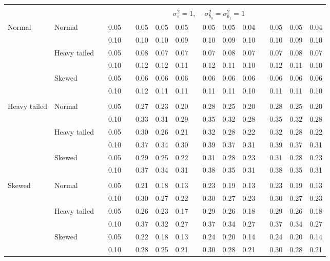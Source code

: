 \documentclass{article} %
\begin{document}
\begin{table}[ht]
\begin{scriptsize}
\begin{center}
\begin{tabular}{ll p{.1cm} c p{.1cm} rrr p{.1cm} rrr p{.1cm} rrr}
&&&&&&&&&&&&&&&\\
& && && \multicolumn{9}{c}{$\sigma_{\varepsilon}^2 = 1$, \ \ $\sigma_{b_0}^2 = \sigma_{b_1}^2 = 1$} \\ \cline{6-16}
\rowcolor{gray!20}Normal       & Normal       && 0.05 &&   0.05 & 0.05 & 0.05 && 0.05 & 0.05 & 0.04 && 0.05 & 0.05 & 0.04 \\ 
\rowcolor{gray!20}             &              && 0.10 &&   0.10 & 0.10 & 0.09 && 0.10 & 0.09 & 0.10 && 0.10 & 0.09 & 0.10 \\ 
\rowcolor{gray!20}             & Heavy tailed && 0.05 &&   0.08 & 0.07 & 0.07 && 0.07 & 0.08 & 0.07 && 0.07 & 0.08 & 0.07 \\ 
\rowcolor{gray!20}             &              && 0.10 &&   0.12 & 0.12 & 0.11 && 0.12 & 0.11 & 0.10 && 0.12 & 0.11 & 0.10 \\ 
\rowcolor{gray!20}             & Skewed       && 0.05 &&   0.06 & 0.06 & 0.06 && 0.06 & 0.06 & 0.06 && 0.06 & 0.06 & 0.06 \\ 
\rowcolor{gray!20}             &              && 0.10 &&   0.12 & 0.11 & 0.11 && 0.11 & 0.11 & 0.10 && 0.11 & 0.11 & 0.10 \\ 
             &&&&&&&&&&&&&&&\\
Heavy tailed & Normal       && 0.05 &&   0.27 & 0.23 & 0.20 && 0.28 & 0.25 & 0.20 && 0.28 & 0.25 & 0.20 \\ 
             &              && 0.10 &&   0.33 & 0.31 & 0.29 && 0.35 & 0.32 & 0.28 && 0.35 & 0.32 & 0.28 \\ 
             & Heavy tailed && 0.05 &&   0.30 & 0.26 & 0.21 && 0.32 & 0.28 & 0.22 && 0.32 & 0.28 & 0.22 \\ 
             &              && 0.10 &&   0.37 & 0.34 & 0.30 && 0.39 & 0.37 & 0.31 && 0.39 & 0.37 & 0.31 \\ 
             & Skewed       && 0.05 &&   0.29 & 0.25 & 0.22 && 0.31 & 0.28 & 0.23 && 0.31 & 0.28 & 0.23 \\ 
             &              && 0.10 &&   0.37 & 0.34 & 0.31 && 0.38 & 0.35 & 0.31 && 0.38 & 0.35 & 0.31 \\ 
             &&&&&&&&&&&&&&&\\
Skewed       & Normal       && 0.05 &&   0.21 & 0.18 & 0.13 && 0.23 & 0.19 & 0.13 && 0.23 & 0.19 & 0.13 \\ 
             &              && 0.10 &&   0.30 & 0.27 & 0.22 && 0.30 & 0.27 & 0.23 && 0.30 & 0.27 & 0.23 \\ 
             & Heavy tailed && 0.05 &&   0.26 & 0.23 & 0.17 && 0.29 & 0.26 & 0.18 && 0.29 & 0.26 & 0.18 \\ 
             &              && 0.10 &&   0.37 & 0.32 & 0.27 && 0.37 & 0.34 & 0.27 && 0.37 & 0.34 & 0.27 \\ 
             & Skewed       && 0.05 &&   0.22 & 0.18 & 0.13 && 0.24 & 0.20 & 0.14 && 0.24 & 0.20 & 0.14 \\ 
             &              && 0.10 &&   0.28 & 0.25 & 0.21 && 0.30 & 0.28 & 0.21 && 0.30 & 0.28 & 0.21 \\ 



\end{tabular}
\end{center}
\end{scriptsize}
\end{table}
\end{document}
